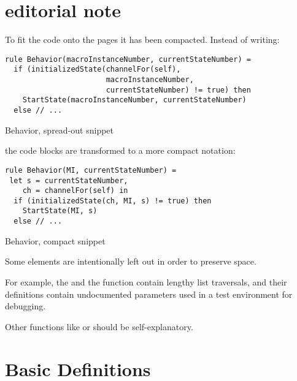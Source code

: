 \section{editorial note}

To fit the code onto the pages it has been compacted. Instead of writing:

\begin{listing}[H]
\begin{verbatim}
rule Behavior(macroInstanceNumber, currentStateNumber) =
  if (initializedState(channelFor(self),
                       macroInstanceNumber,
                       currentStateNumber) != true) then
    StartState(macroInstanceNumber, currentStateNumber)
  else // ...
\end{verbatim}
\caption{Behavior, spread-out snippet}
\label{lst:asm:Behavior_snipped_spread-out}
\end{listing}

the code blocks are transformed to a more compact notation:

\begin{listing}[H]
\begin{verbatim}
rule Behavior(MI, currentStateNumber) =
 let s = currentStateNumber,
    ch = channelFor(self) in
  if (initializedState(ch, MI, s) != true) then
    StartState(MI, s)
  else // ...
\end{verbatim}
\caption{Behavior, compact snippet}
\label{lst:asm:Behavior_snipped_compact}
\end{listing}




Some elements are intentionally left out in order to preserve space.

For example, the  and
the   function
contain lengthy list traversals, and their definitions contain
undocumented parameters used in a test environment for debugging.

Other functions like  or  should be self-explanatory.




\newpage
\section{Basic Definitions}

